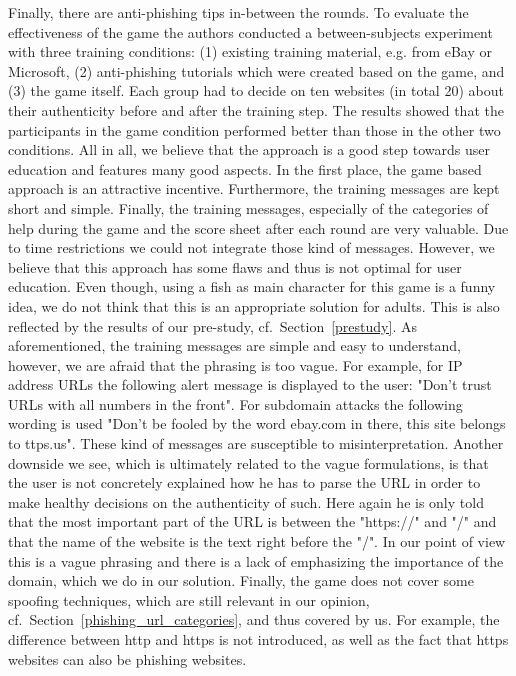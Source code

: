 Finally, there are anti-phishing tips in-between the rounds. 
To evaluate the effectiveness of the game the authors conducted a between-subjects experiment with three training conditions: 
(1) existing training material, e.g. from eBay or Microsoft, (2) anti-phishing tutorials which were created based on the game, and (3) the game itself. 
Each group had to decide on ten websites (in total 20) about their authenticity before and after the training step. 
The results showed that the participants in the game condition performed better than those in the other two conditions. 
All in all, we believe that the approach is a good step towards user education and features many good aspects. 
In the first place, the game based approach is an attractive incentive. 
Furthermore, the training messages are kept short and simple. 
Finally, the training messages, especially of the categories of help during the game and the score sheet after each round are very valuable. 
Due to time restrictions we could not integrate those kind of messages. 
However, we believe that this approach has some flaws and thus is not optimal for user education. 
Even though, using a fish as main character for this game is a funny idea, we do not think that this is an appropriate solution for adults. 
This is also reflected by the results of our pre-study, cf.~Section~\ref{prestudy}. 
As aforementioned, the training messages are simple and easy to understand, however, we are afraid that the phrasing is too vague. 
For example, for IP address URLs the following alert message is displayed to the user: 
"Don't trust URLs with all numbers in the front". 
For subdomain attacks the following wording is used "Don't be fooled by the word ebay.com in there, this site belongs to ttps.us". 
These kind of messages are susceptible to misinterpretation. 
Another downside we see, which is ultimately related to the vague formulations, is that the user is not concretely explained how he has to parse the URL in order to make healthy decisions on the authenticity of such. 
Here again he is only told that the most important part of the URL is between the "https://" and "/" and that the name of the website is the text right before the "/". 
In our point of view this is a vague phrasing and there is a lack of emphasizing the importance of the domain, which we do in our solution. 
Finally, the game does not cover some spoofing techniques, which are still relevant in our opinion, cf.~Section~\ref{phishing_url_categories}, and thus covered by us. 
For example, the difference between http and https is not introduced, as well as the fact that https websites can also be phishing websites. 
